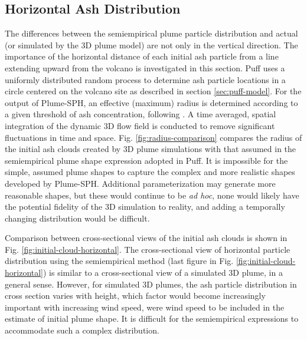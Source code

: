 \documentclass[utf8]{frontiersSCNS} %
\begin{document}
\subsection{Horizontal Ash Distribution}

The differences between the semiempirical plume particle distribution and actual (or simulated by the 3D plume model) are not only in the vertical direction. The importance of the horizontal distance of each initial ash particle from a line extending upward from the volcano is investigated in this section.  Puff uses a uniformly distributed random process to determine ash particle locations in a circle centered on the volcano site as described in section \ref{sec:puff-model}. For the output of Plume-SPH, an effective (maximum) radius is determined according to a given threshold of ash concentration, following \citet {cerminara2016large}. A time averaged, spatial integration of the dynamic 3D flow field is conducted to remove significant fluctuations in time and space. Fig. \ref{fig:radius-comparison} compares the radius of the initial ash clouds created by 3D plume simulations with that assumed in the semiempirical plume shape expression adopted in Puff. It is impossible for the simple, assumed plume shapes to capture the complex and more realistic shapes developed by Plume-SPH. Additional parameterization may generate more reasonable shapes, but these would continue to be \textit{ad hoc}, none would likely have the potential fidelity of the 3D simulation to reality, and adding a temporally changing distribution would be difficult.

Comparison between cross-sectional views of the initial ash clouds is shown in Fig. \ref{fig:initial-cloud-horizontal}. The cross-sectional view of horizontal particle distribution using the semiempirical method (last figure in Fig. \ref{fig:initial-cloud-horizontal}) is similar to a cross-sectional view of a simulated 3D plume, in a general sense. However, for simulated 3D plumes, the ash particle distribution in cross section varies with height, which factor would become increasingly important with increasing wind speed, were wind speed to be included in the estimate of initial plume shape. It is difficult for the semiempirical expressions to accommodate such a complex distribution.
\end{document}
